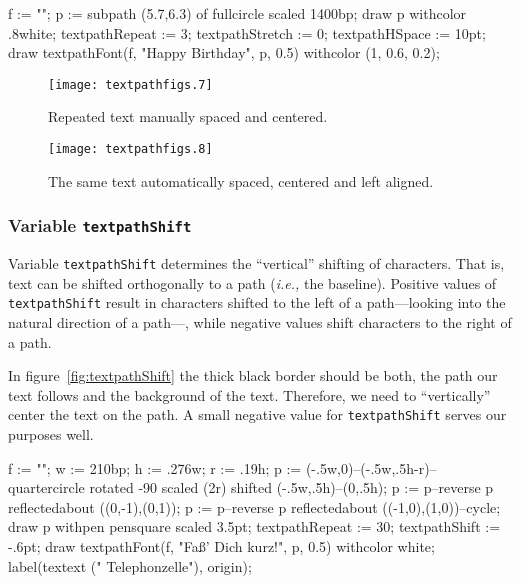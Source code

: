 \documentclass{article}
\newcommand*{\cmd}[1]{\texttt{#1}}
\newenvironment{listing}{%
  \small%
  \verbatim%
}{%
  \endverbatim%
}
\begin{document}
\begin{listing}
f := "\Large";
p := subpath (5.7,6.3) of fullcircle scaled 1400bp;
draw p withcolor .8white;
textpathRepeat := 3;
textpathStretch := 0;
textpathHSpace := 10pt;
draw textpathFont(f, "Happy Birthday", p, 0.5) withcolor (1, 0.6, 0.2);
\end{listing}

\begin{figure}
  \centering
  \texttt{[image: textpathfigs.7]}
  \caption{Repeated text manually spaced and centered.}
  \label{fig:textpathHSpace}
  \vspace{\baselineskip}
  \texttt{[image: textpathfigs.8]}
  \caption{The same text automatically spaced, centered and left aligned.}
  \label{fig:textpathStretch}
\end{figure}



\subsubsection{Variable \cmd{textpathShift}}
Variable \cmd{textpathShift} determines the ``vertical'' shifting of characters.  That is, text can be shifted orthogonally to a path (\emph{i.e.,} the baseline).  Positive values of \cmd{textpathShift} result in characters shifted to the left of a path---looking into the natural direction of a path---, while negative values shift characters to the right of a path.

In figure~\ref{fig:textpathShift} the thick black border should be both, the path our text follows and the background of the text.  Therefore, we need to ``vertically'' center the text on the path.  A small negative value for \cmd{textpathShift} serves our purposes well.

\begin{listing}
f := "\fontsize{2.1pt}{2.1pt}\selectfont";
w := 210bp;
h := .276w;
r := .19h;
p := (-.5w,0)--(-.5w,.5h-r)--quartercircle rotated -90 scaled (2r)
  shifted (-.5w,.5h)--(0,.5h);
p := p--reverse p reflectedabout ((0,-1),(0,1));
p := p--reverse p reflectedabout ((-1,0),(1,0))--cycle;
draw p withpen pensquare scaled 3.5pt;
textpathRepeat := 30;
textpathShift := -.6pt;
draw textpathFont(f, "Fa\ss' Dich kurz!", p, 0.5) withcolor white;
label(textext
  ("\fontsize{22pt}{22pt}\selectfont
  Telephonzelle"), origin);%
\end{listing}
\end{document}
